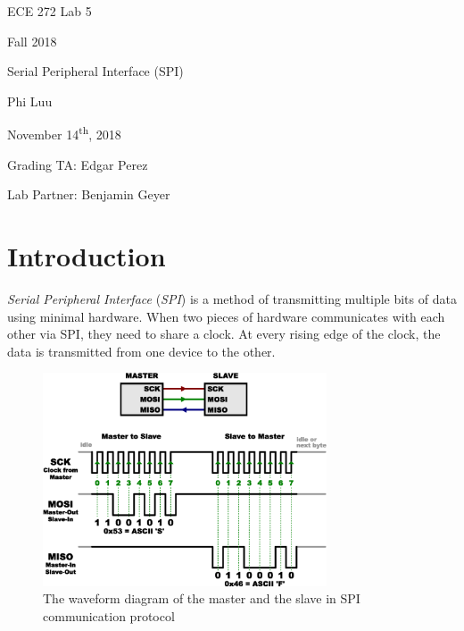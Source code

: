 \documentclass[12pt]{article}
\begin{document}
\begin{titlepage}
  \begin{center} \LARGE
    \vspace*{1.5in}

    ECE 272 Lab 5

    Fall 2018

    \vfill

    Serial Peripheral Interface (SPI)

    Phi Luu

    \vfill

    November 14\textsuperscript{th}, 2018

    Grading TA: Edgar Perez

    Lab Partner: Benjamin Geyer

    \vspace{1.5in}
  \end{center}
\end{titlepage}

\section{Introduction}

\textit{Serial Peripheral Interface} (\textit{SPI}) is a method of transmitting multiple bits of data using minimal hardware. When two pieces of hardware communicates with each other via SPI, they need to share a clock. At every rising edge of the clock, the data is transmitted from one device to the other.

\begin{figure}[ht]
  \centering
  \includegraphics[width=0.75\textwidth]{spi.png}
  \caption{The waveform diagram of the master and the slave in SPI communication protocol \cite{SparkFunSpi}}
  \label{figure:1}
\end{figure}
\end{document}
